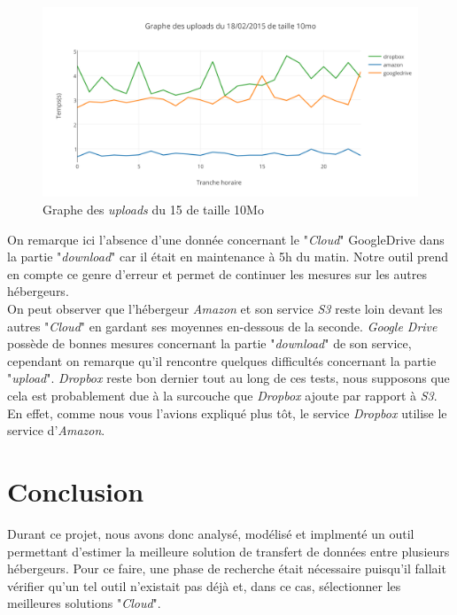 \documentclass[10pt]{article}
\begin{document}
\begin{figure}[h] \centering
\includegraphics[scale=0.65]{graphe_des_uploads_du_18022015_de_taille_10mo.png}
\caption{Graphe des \textit{uploads} du 15 de taille 10Mo} \end{figure}

On remarque ici l'absence d'une donnée concernant le "\textit{Cloud}"
GoogleDrive dans la partie "\textit{download}" car il était en maintenance à 5h
du matin. Notre outil prend en compte ce genre d'erreur et permet de continuer
les mesures sur les autres hébergeurs.\\

On peut observer que l'hébergeur \textit{Amazon} et son service \textit{S3}
reste loin devant les autres "\textit{Cloud}" en gardant ses moyennes
en-dessous de la seconde.  \textit{Google Drive} possède de bonnes mesures
concernant la partie "\textit{download}" de son service, cependant on remarque
qu'il rencontre quelques difficultés concernant la partie "\textit{upload}".
\textit{Dropbox} reste bon dernier tout au long de ces tests, nous supposons
que cela est probablement due à la surcouche que \textit{Dropbox} ajoute par
rapport à \textit{S3}. En effet, comme nous vous l'avions expliqué plus tôt, le
service \textit{Dropbox} utilise le service d'\textit{Amazon}.


\section{Conclusion}

Durant ce projet, nous avons donc analysé, modélisé et implmenté un outil
permettant d'estimer la meilleure solution de transfert de données entre
plusieurs hébergeurs. Pour ce faire, une phase de recherche était nécessaire
puisqu'il fallait vérifier qu'un tel outil n'existait pas déjà et, dans ce cas,
sélectionner les meilleures solutions "\textit{Cloud}".\\
\end{document}
